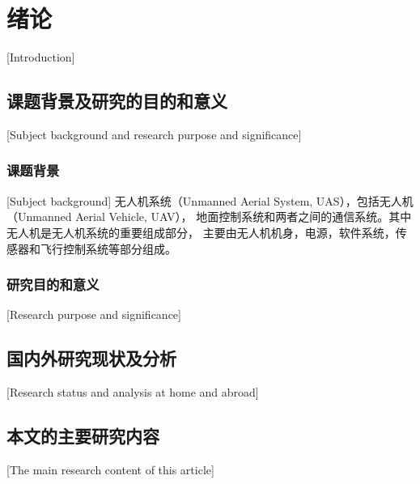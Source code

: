 
\chapter[绪论]{绪论}[Introduction]

\section{课题背景及研究的目的和意义}[Subject background and research purpose and significance]
\subsection{课题背景}[Subject background]
无人机系统（Unmanned Aerial System, UAS），包括无人机（Unmanned Aerial Vehicle, UAV），
地面控制系统和两者之间的通信系统\cite{sharma2020communication}。其中无人机是无人机系统的重要组成部分，
主要由无人机机身，电源，软件系统，传感器和飞行控制系统等部分组成。



\subsection{研究目的和意义}[Research purpose and significance]

\section{国内外研究现状及分析}[Research status and analysis at home and abroad]

\section{本文的主要研究内容}[The main research content of this article]


